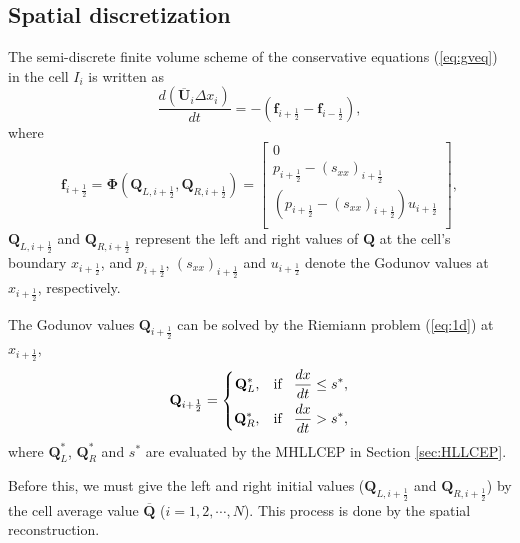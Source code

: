 \documentclass[review]{elsarticle}
\begin{document}
\subsection{Spatial discretization}
The  semi-discrete finite volume scheme of the conservative equations (\ref{eq:gveq}) in the cell $I_i$ is written as
\begin{equation}\label{eq:sem}
  \frac{d(\overline{\mathbf{U}}_i\Delta x_i)}{dt} = -(\mathbf{f}_{i+\frac{1}{2}} - \mathbf{f}_{i-\frac{1}{2}}),
\end{equation}
where
\begin{equation}
  \mathbf{f}_{i+\frac{1}{2}} = \mathbf{\Phi} (\mathbf{Q}_{L,i+\frac{1}{2}}, \mathbf{Q}_{R,i+\frac{1}{2}})  = \left[
    \begin{array}{l}
      0\\
      p_{i+\frac{1}{2}} - (s_{xx})_{i+\frac{1}{2}}\\
      (p_{i+\frac{1}{2}} - (s_{xx})_{i+\frac{1}{2}})u_{i+\frac{1}{2}}\\
    \end{array}
  \right],
\end{equation}
$\mathbf{Q}_{L,i+\frac{1}{2}}$ and $\mathbf{Q}_{R,i+\frac{1}{2}}$ represent the left and right values of $\mathbf{Q}$ at the cell's boundary $x_{i+\frac{1}{2}}$, and  $p_{i+\frac{1}{2}}$, $(s_{xx})_{i+\frac{1}{2}}$ and $u_{i+\frac{1}{2}}$ denote the Godunov values at $x_{i+\frac{1}{2}}$, respectively.

The Godunov values  $\mathbf{Q}_{i+\frac{1}{2}}$  can be solved  by the Riemiann problem  (\ref{eq:1d}) at $x_{i+\frac{1}{2}}$,
\begin{equation}\label{eq:qLR}
  \mathbf{Q}_{i+\frac{1}{2}} = \left\{ \begin{aligned}
    \mathbf{Q}_L^*, \hspace{0.3cm} \text{if} \hspace{0.3cm} \frac{dx}{dt} \le  s^*,\\
    \mathbf{Q}_R^*, \hspace{0.3cm} \text{if} \hspace{0.3cm} \frac{dx}{dt} > s^*,\\
  \end{aligned} \right.
\end{equation}
where $\mathbf{Q}_L^*$, $\mathbf{Q}_R^*$ and $s^*$ are evaluated by the MHLLCEP in Section \ref{sec:HLLCEP}.

Before this, we must give the left  and right initial values ($\mathbf{Q}_{L,i+\frac{1}{2}}$ and $\mathbf{Q}_{R,i+\frac{1}{2}}$) by the cell average value $\overline{\mathbf{Q}}$ ($i = 1,2,\cdots,N$). This process is done by the spatial reconstruction.
\end{document}
